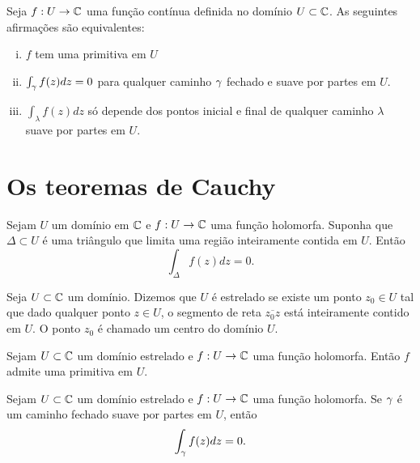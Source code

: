 \begin{teorema}
Seja $f:U\to \mathbb{C}$ uma função contínua definida no domínio $U\subset\mathbb{C}$. As seguintes afirmações são equivalentes:
\begin{enumerate}[(i)]
    \item $f$ tem uma primitiva em $U$
    \item $\int_{\gamma} f(z) dz = 0$ para qualquer caminho $\gamma$ fechado e suave por partes em $U$.
    \item $\int_{\lambda} f(z) dz$ só depende dos pontos inicial e final de qualquer caminho $\lambda$ suave por partes em $U$.
\end{enumerate}
\end{teorema}


\section[Os teoremas de Cauchy]{Os teoremas de Cauchy}

\begin{teorema}
\label{teo:cauchy-goursat}
Sejam $U$ um domínio em $\mathbb{C}$ e $f: U \to \mathbb{C}$ uma função holomorfa. Suponha que $\Delta \subset U$ é uma triângulo que limita
uma região inteiramente contida em $U$. Então
\begin{equation*}
    \int_{\Delta} f(z) dz = 0.
\end{equation*}
\end{teorema}


\begin{definicao}
Seja $U\subset\mathbb{C}$ um domínio. Dizemos que $U$ é estrelado se existe um ponto $z_0\in U$
tal que dado qualquer ponto $z\in U$, o segmento de reta $\overline{z_0z}$ está inteiramente contido em $U$. 
O ponto $z_0$ é chamado um centro do domínio $U$.
\end{definicao}


\begin{corolario}
Sejam $U\subset\mathbb{C}$ um domínio estrelado e $f:U\to\mathbb{C}$ uma
função holomorfa. Então $f$ admite uma primitiva em $U$.
\end{corolario}


\begin{corolario}
Sejam $U\subset\mathbb{C}$ um domínio estrelado e $f:U\to\mathbb{C}$ uma função holomorfa.
Se $\gamma$ é um caminho fechado suave por partes em $U$, então
\begin{equation*}
    \int_{\gamma} f(z) dz = 0.
\end{equation*}
\end{corolario}


